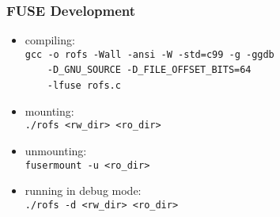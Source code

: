 \documentclass[dvipsnames]{beamer}
\begin{document}
\begin{frame}
  \frametitle{FUSE Development}

  \begin{itemize}
    \item compiling:\\
      \lstinline!gcc -o rofs -Wall -ansi -W -std=c99 -g -ggdb!\\
      ~~~~\lstinline!-D_GNU_SOURCE -D_FILE_OFFSET_BITS=64!\\
      ~~~~\lstinline!-lfuse rofs.c!

    \item mounting:\\
      \lstinline!./rofs <rw_dir> <ro_dir>!

    \item unmounting:\\
      \lstinline!fusermount -u <ro_dir>!

    \item running in debug mode:\\
      \lstinline!./rofs -d <rw_dir> <ro_dir>!
  \end{itemize}
\end{frame}
\end{document}
